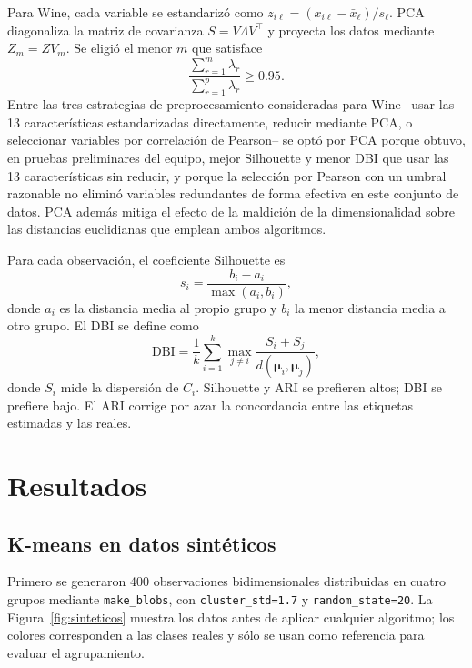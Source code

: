 \documentclass[10pt,twocolumn]{article}
\begin{document}
Para Wine, cada variable se estandarizó como
$z_{i\ell}=(x_{i\ell}-\bar{x}_{\ell})/s_{\ell}$. PCA diagonaliza la matriz de
covarianza $S=V\Lambda V^\top$ y proyecta los datos mediante $Z_m=ZV_m$.
Se eligió el menor $m$ que satisface
\begin{equation}
 \frac{\sum_{r=1}^{m}\lambda_r}{\sum_{r=1}^{p}\lambda_r}\geq0.95.
 \label{eq:pca}
\end{equation}
Entre las tres estrategias de preprocesamiento consideradas para Wine
--usar las 13 características estandarizadas directamente, reducir
mediante PCA, o seleccionar variables por correlación de Pearson-- se
optó por PCA porque obtuvo, en pruebas preliminares del equipo, mejor
Silhouette y menor DBI que usar las 13 características sin reducir, y
porque la selección por Pearson con un umbral razonable no eliminó
variables redundantes de forma efectiva en este conjunto de datos. PCA
además mitiga el efecto de la maldición de la dimensionalidad sobre las
distancias euclidianas que emplean ambos algoritmos.

Para cada observación, el coeficiente Silhouette es
\begin{equation}
 s_i=\frac{b_i-a_i}{\max(a_i,b_i)},
 \label{eq:silhouette}
\end{equation}
donde $a_i$ es la distancia media al propio grupo y $b_i$ la menor distancia
media a otro grupo. El DBI se define como
\begin{equation}
 \mathrm{DBI}=\frac{1}{k}\sum_{i=1}^{k}\max_{j\ne i}
 \frac{S_i+S_j}{d(\bm{\mu}_i,\bm{\mu}_j)},
 \label{eq:dbi}
\end{equation}
donde $S_i$ mide la dispersión de $C_i$. Silhouette y ARI se prefieren altos;
DBI se prefiere bajo. El ARI corrige por azar la concordancia entre las
etiquetas estimadas y las reales.

\section{Resultados}

\subsection{K-means en datos sintéticos}

Primero se generaron 400 observaciones bidimensionales distribuidas en cuatro
grupos mediante \texttt{make\_blobs}, con \texttt{cluster\_std=1.7} y
\texttt{random\_state=20}. La Figura~\ref{fig:sinteticos} muestra los datos
antes de aplicar cualquier algoritmo; los colores corresponden a las clases
reales y sólo se usan como referencia para evaluar el agrupamiento.
\end{document}
